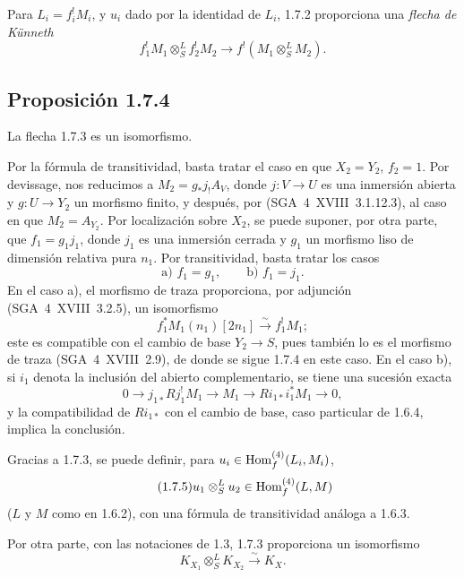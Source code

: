 Para $L_i=f_i^{!}M_i$, y $u_i$ dado por la identidad de $L_i$, 1.7.2 proporciona una \emph{flecha de Künneth}
\begin{equation}\tag{1.7.3}
f_1^{!}M_1\otimes^{L}_{S}f_2^{!}M_2\longrightarrow f^{!}(M_1\otimes^{L}_{S}M_2).
\end{equation}

\subsection*{Proposición 1.7.4}
La flecha 1.7.3 es un isomorfismo.

Por la fórmula de transitividad, basta tratar el caso en que $X_2=Y_2$, $f_2=1$. Por devissage, nos reducimos a $M_2=g_{*}j_{!}A_V$, donde $j:V\to U$ es una inmersión abierta y $g:U\to Y_2$ un morfismo finito, y después, por (SGA~4~XVIII~3.1.12.3), al caso en que $M_2=A_{Y_2}$. Por localización sobre $X_2$, se puede suponer, por otra parte, que $f_1=g_1j_1$, donde $j_1$ es una inmersión cerrada y $g_1$ un morfismo liso de dimensión relativa pura $n_1$. Por transitividad, basta tratar los casos
\[
\text{a) } f_1=g_1,\qquad \text{b) } f_1=j_1.
\]
En el caso a), el morfismo de traza proporciona, por adjunción (SGA~4~XVIII~3.2.5), un isomorfismo
\[
f_1^{*}M_1(n_1)[2n_1]\xrightarrow{\sim}f_1^{!}M_1;
\]
este es compatible con el cambio de base $Y_2\to S$, pues también lo es el morfismo de traza (SGA~4~XVIII~2.9), de donde se sigue 1.7.4 en este caso. En el caso b), si $i_1$ denota la inclusión del abierto complementario, se tiene una sucesión exacta
\[
0\longrightarrow j_{1*}Rj_1^{!}M_1\longrightarrow M_1\longrightarrow Ri_{1*}i_1^{*}M_1\longrightarrow0,
\]
y la compatibilidad de $Ri_{1*}$ con el cambio de base, caso particular de 1.6.4, implica la conclusión.

Gracias a 1.7.3, se puede definir, para $u_i\in\operatorname{Hom}_f^{(4)}(L_i,M_i)$,
\begin{equation}\tag{1.7.5}
u_1\otimes^{L}_{S}u_2\in\operatorname{Hom}_f^{(4)}(L,M)
\end{equation}
($L$ y $M$ como en 1.6.2), con una fórmula de transitividad análoga a 1.6.3.

Por otra parte, con las notaciones de 1.3, 1.7.3 proporciona un isomorfismo
\begin{equation}\tag{1.7.6}
K_{X_1}\otimes^{L}_{S}K_{X_2}\xrightarrow{\sim}K_X.
\end{equation}

